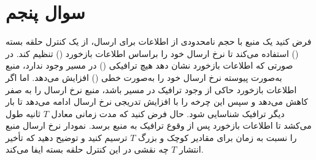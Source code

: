 \section{سوال پنجم}

فرض کنید یک منبع با حجم نامحدودی از اطلاعات برای ارسال، از یک کنترل حلقه بسته () استفاده می‌کند تا نرخ ارسال خود را براساس اطلاعات بازخورد () تنظیم کند. در صورتی که اطلاعات بازخورد نشان دهد هیچ ترافیکی () در مسیر وجود ندارد، منبع به‌صورت پیوسته نرخ ارسال خود را به‌صورت خطی () افزایش می‌دهد. اما اگر اطلاعات بازخورد حاکی از وجود ترافیک در مسیر باشد، منبع نرخ ارسال را به صفر کاهش می‌دهد و سپس این چرخه را با افزایش تدریجی نرخ ارسال ادامه می‌دهد تا بار دیگر ترافیک شناسایی شود. حال فرض کنید که مدت زمانی معادل $T$ ثانیه طول می‌کشد تا اطلاعات بازخورد پس از وقوع ترافیک به منبع برسد. نمودار نرخ ارسال منبع را نسبت به زمان برای مقادیر کوچک و بزرگ $T$ ترسیم کنید و توضیح دهید که تأخیر انتشار $T$  چه نقشی در این کنترل حلقه بسته ایفا می‌کند.


